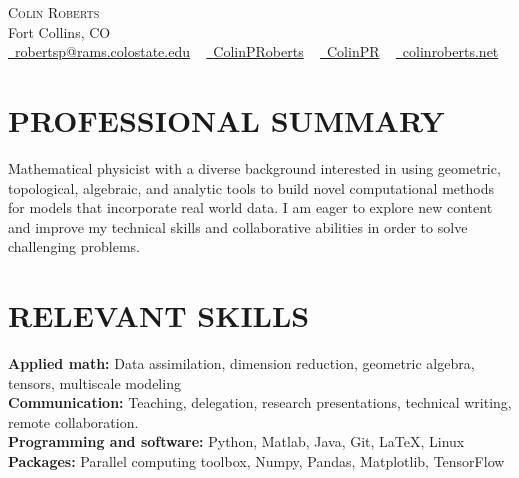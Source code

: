 \documentclass[letterpaper,11pt]{article}
\newcommand{\accentcolor}[1]{\textcolor{accentcolor}{#1}}
\begin{document}


\begin{center}
    {\Huge \scshape Colin Roberts} \\ \vspace{1pt}
    Fort Collins, CO \\ \vspace{1pt}
    \href{mailto:robertsp@rams.colostate.edu}{\faEnvelope \ \accentcolor{robertsp@rams.colostate.edu}} ~
    \href{https://www.linkedin.com/in/colinproberts/}{\faLinkedinSquare \ \accentcolor{ColinPRoberts}}  ~
    \href{https://github.com/ColinPR}{\faGithub \ \accentcolor{ColinPR}} ~
    \href{https://www.colinroberts.net}{\faGreaterThan \ \accentcolor{colinroberts.net}}
\end{center}

\vspace*{-20pt}
\section{PROFESSIONAL SUMMARY}
    Mathematical physicist with a diverse background interested in using geometric, topological, algebraic, and analytic tools to build novel computational methods for models that incorporate real world data. I am eager to explore new content and improve my technical skills and collaborative abilities in order to solve challenging problems. 
 \vspace{-5pt}
\section{RELEVANT SKILLS}
 \begin{itemize}[leftmargin=0in, label={}]
    \small{\item{

     \textbf{\normalsize{Applied math:}}{ \normalsize{Data assimilation, dimension reduction, geometric algebra, tensors, multiscale modeling}} \\
     \textbf{\normalsize{Communication:}}{ \normalsize{Teaching, delegation, research presentations, technical writing, remote collaboration.}} \\
     \textbf{\normalsize{Programming and software:}}{ \normalsize{Python, Matlab, Java, Git, \LaTeX, Linux}} \\
     \textbf{\normalsize{Packages:}}{ \normalsize{Parallel computing toolbox, Numpy, Pandas, Matplotlib, TensorFlow}} \\	
	}}
 \end{itemize}
 \vspace{-25pt}
\end{document}
